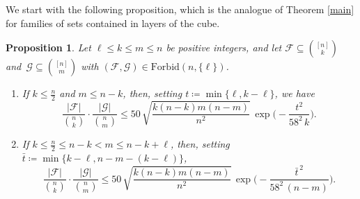 \documentclass[10pt]{amsart}
\newtheorem{prop}[thm]{Proposition}
\theoremstyle{remark}
\newcommand{\mik}{\leqslant}
\newcommand{\Fcal}{\mathcal{F}}
\newcommand{\Gcal}{\mathcal{G}}
\begin{document}
We start with the following proposition, which is the analogue of Theorem \ref{main} for families
of sets contained in layers of the cube.
\begin{prop} \label{p7.1}
Let $\ell\mik k\mik m\mik n$ be positive integers, and let $\Fcal\subseteq\binom{[n]}{k}$
and\, $\Gcal\subseteq\binom{[n]}{m}$ with $(\Fcal,\Gcal)\in\mathrm{Forbid}(n,\{\ell\})$.
\begin{enumerate}
\item[(i)] If $k\mik \frac{n}{2}$ and $m\mik n-k$, then, setting
$t\coloneqq \min\{\ell,k-\ell\}$, we have
\begin{equation} \label{e7.1}
\frac{|\Fcal|}{\binom{n}{k}}\cdot \frac{|\Gcal|}{\binom{n}{m}} \mik 50\,
\sqrt{\frac{k(n-k)m(n-m)}{n^2}}\, \exp\Big(-\frac{t^2}{58^2\,k}\Big).
\end{equation}
\item[(ii)] If $k\mik \frac{n}{2}\mik n-k< m\mik n-k+\ell$, then, setting
$\bar{t}\coloneqq \min\{k-\ell,n-m-(k-\ell)\}$,
\begin{equation} \label{e7.2}
\frac{|\Fcal|}{\binom{n}{k}}\cdot \frac{|\Gcal|}{\binom{n}{m}} \mik 50\,
\sqrt{\frac{k(n-k)m(n-m)}{n^2}}\, \exp\Big(-\frac{\bar{t}^{\,2}}{58^2\, (n-m)}\Big).
\end{equation}
\end{enumerate}
\end{prop}
\end{document}
